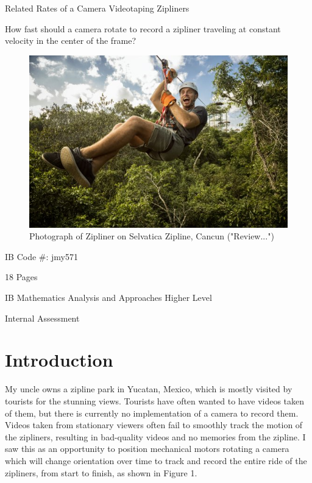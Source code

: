 \documentclass[12pt]{article}
\begin{document}
\nocite{zippic}
\nocite{annotated}

\begin{titlepage}
   \begin{center}

        \Huge{Related Rates of a Camera Videotaping Zipliners}

        \vspace{0.5cm}
        \LARGE{How fast should a camera rotate to record a zipliner traveling at constant velocity in the center of the frame?}
        \vspace{0.5cm}
        \begin{figure}[H]
        \centering
        \includegraphics[width=400pt]{img/zipline.jpg}
        \caption{\label{fig:0} Photograph of Zipliner on Selvatica Zipline, Cancun ("Review...")}
        \end{figure}

        \vspace{0.5 cm}
        \Large{IB Code \#: jmy571}
        
        \vspace{1 cm}
        \large{18 Pages}
      
        \large{IB Mathematics Analysis and Approaches Higher Level}

        \Large{Internal Assessment}
       

       \vfill
    \end{center}
\end{titlepage}
    
\tableofcontents
\newpage
    
\section{Introduction}
My uncle owns a zipline park in Yucatan, Mexico, which is mostly visited by tourists for the stunning views. Tourists have often wanted to have videos taken of them, but there is currently no implementation of a camera to record them. Videos taken from stationary viewers often fail to smoothly track the motion of the zipliners, resulting in bad-quality videos and no memories from the zipline. I saw this as an opportunity to position mechanical motors rotating a camera which will change orientation over time to track and record the entire ride of the zipliners, from start to finish, as shown in Figure 1.
\end{document}
